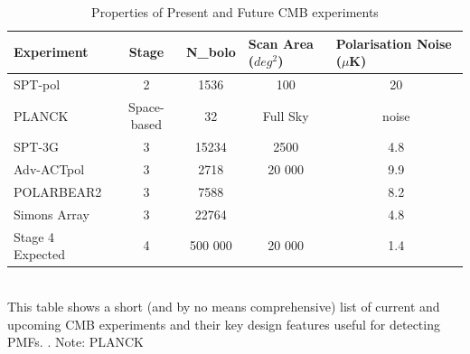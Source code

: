 \begin{table}[b]
\centering
\caption{Properties of Present and Future CMB experiments}
\label{my-label}
\begin{tabular}{l|l|l|l|l}
Experiment & \multicolumn{1}{c|}{Stage} & \multicolumn{1}{c|}{N_{bolo}} & Scan Area ($deg^{2}$)& Polarisation Noise ($\mu$K) \\ \hline
SPT-pol & \multicolumn{1}{c|}{2} & \multicolumn{1}{c|}{1536} & \multicolumn{1}{c|}{100} & \multicolumn{1}{c}{20} \\
PLANCK & \multicolumn{1}{c|}{Space-based} & \multicolumn{1}{c|}{32} & \multicolumn{1}{c|}{Full Sky} & \multicolumn{1}{c}{noise} \\
SPT-3G & \multicolumn{1}{c|}{3} & \multicolumn{1}{c|}{15234} & \multicolumn{1}{c|}{2500} & \multicolumn{1}{c}{4.8} \\
Adv-ACTpol & \multicolumn{1}{c|}{3} & \multicolumn{1}{c|}{2718} & \multicolumn{1}{c|}{20 000} & \multicolumn{1}{c}{9.9} \\
POLARBEAR2 & \multicolumn{1}{c|}{3} & \multicolumn{1}{c|}{7588} & \multicolumn{1}{c|}{} & \multicolumn{1}{c}{8.2} \\
Simons Array & \multicolumn{1}{c|}{3} & \multicolumn{1}{c|}{22764} & \multicolumn{1}{c|}{} & \multicolumn{1}{c}{4.8} \\ 
Stage 4 Expected & \multicolumn{1}{c|}{4} & \multicolumn{1}{c|}{500 000} & \multicolumn{1}{c|}{20 000} & \multicolumn{1}{c}{1.4} \\
\end{tabular}
\bigskip
\\This table shows a short (and by no means comprehensive) list of current and upcoming CMB experiments and their key design features useful for detecting PMFs. \cite{Henderson:2015nzj} \cite{Benson:2014qhw} \cite{Suzuki:2015zzg}. Note: PLANCK
\end{table}
